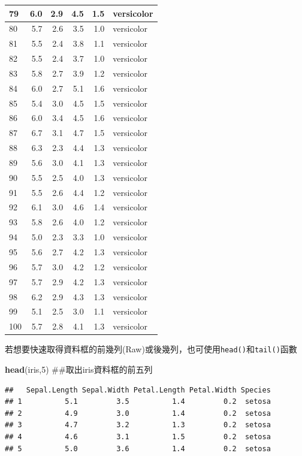 \documentclass[]{book}
\newenvironment{Shaded}{\begin{snugshade}}{\end{snugshade}}
\newcommand{\KeywordTok}[1]{\textcolor[rgb]{0.13,0.29,0.53}{\textbf{{#1}}}}
\newcommand{\DecValTok}[1]{\textcolor[rgb]{0.00,0.00,0.81}{{#1}}}
\newcommand{\NormalTok}[1]{{#1}}
\theoremstyle{definition}
\theoremstyle{definition}
\theoremstyle{remark}
\begin{document}
\begin{tabular}{l|r|r|r|r|l}
\hline
79 & 6.0 & 2.9 & 4.5 & 1.5 & versicolor\\
\hline
80 & 5.7 & 2.6 & 3.5 & 1.0 & versicolor\\
\hline
81 & 5.5 & 2.4 & 3.8 & 1.1 & versicolor\\
\hline
82 & 5.5 & 2.4 & 3.7 & 1.0 & versicolor\\
\hline
83 & 5.8 & 2.7 & 3.9 & 1.2 & versicolor\\
\hline
84 & 6.0 & 2.7 & 5.1 & 1.6 & versicolor\\
\hline
85 & 5.4 & 3.0 & 4.5 & 1.5 & versicolor\\
\hline
86 & 6.0 & 3.4 & 4.5 & 1.6 & versicolor\\
\hline
87 & 6.7 & 3.1 & 4.7 & 1.5 & versicolor\\
\hline
88 & 6.3 & 2.3 & 4.4 & 1.3 & versicolor\\
\hline
89 & 5.6 & 3.0 & 4.1 & 1.3 & versicolor\\
\hline
90 & 5.5 & 2.5 & 4.0 & 1.3 & versicolor\\
\hline
91 & 5.5 & 2.6 & 4.4 & 1.2 & versicolor\\
\hline
92 & 6.1 & 3.0 & 4.6 & 1.4 & versicolor\\
\hline
93 & 5.8 & 2.6 & 4.0 & 1.2 & versicolor\\
\hline
94 & 5.0 & 2.3 & 3.3 & 1.0 & versicolor\\
\hline
95 & 5.6 & 2.7 & 4.2 & 1.3 & versicolor\\
\hline
96 & 5.7 & 3.0 & 4.2 & 1.2 & versicolor\\
\hline
97 & 5.7 & 2.9 & 4.2 & 1.3 & versicolor\\
\hline
98 & 6.2 & 2.9 & 4.3 & 1.3 & versicolor\\
\hline
99 & 5.1 & 2.5 & 3.0 & 1.1 & versicolor\\
\hline
100 & 5.7 & 2.8 & 4.1 & 1.3 & versicolor\\
\hline
\end{tabular}

若想要快速取得資料框的前幾列(Raw)或後幾列，也可使用\texttt{head()}和\texttt{tail()}函數

\begin{Shaded}
\begin{Highlighting}[]
\KeywordTok{head}\NormalTok{(iris,}\DecValTok{5}\NormalTok{) ##取出iris資料框的前五列}
\end{Highlighting}
\end{Shaded}

\begin{verbatim}
##   Sepal.Length Sepal.Width Petal.Length Petal.Width Species
## 1          5.1         3.5          1.4         0.2  setosa
## 2          4.9         3.0          1.4         0.2  setosa
## 3          4.7         3.2          1.3         0.2  setosa
## 4          4.6         3.1          1.5         0.2  setosa
## 5          5.0         3.6          1.4         0.2  setosa
\end{verbatim}
\end{document}
